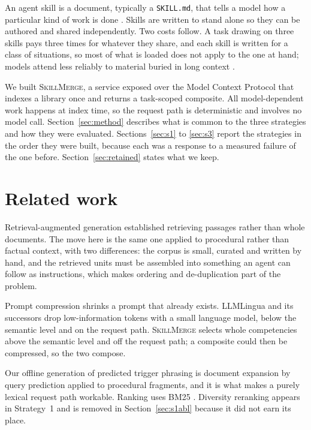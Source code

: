 \documentclass[11pt]{article}
\newcommand{\sm}{\textsc{SkillMerge}}
\begin{document}
An agent skill is a document, typically a \texttt{SKILL.md}, that tells a model how a particular
kind of work is done \citep{anthropic2025skills}. Skills are written to stand alone so they can be
authored and shared independently. Two costs follow. A task drawing on three skills pays three
times for whatever they share, and each skill is written for a class of situations, so most of what
is loaded does not apply to the one at hand; models attend less reliably to material buried in long
context \citep{liu2024lost}.

We built \sm{}, a service exposed over the Model Context Protocol \citep{anthropic2024mcp} that
indexes a library once and returns a task-scoped composite. All model-dependent work happens at
index time, so the request path is deterministic and involves no model call. Section~\ref{sec:method}
describes what is common to the three strategies and how they were evaluated.
Sections~\ref{sec:s1} to \ref{sec:s3} report the strategies in the order they were built, because
each was a response to a measured failure of the one before. Section~\ref{sec:retained} states what
we keep.

\section{Related work}

Retrieval-augmented generation \citep{lewis2020rag} established retrieving passages rather than
whole documents. The move here is the same one applied to procedural rather than factual context,
with two differences: the corpus is small, curated and written by hand, and the retrieved units
must be assembled into something an agent can follow as instructions, which makes ordering and
de-duplication part of the problem.

Prompt compression shrinks a prompt that already exists. LLMLingua \citep{jiang2023llmlingua} and
its successors \citep{pan2024llmlingua2} drop low-information tokens with a small language model,
below the semantic level and on the request path. \sm{} selects whole competencies above the
semantic level and off the request path; a composite could then be compressed, so the two compose.

Our offline generation of predicted trigger phrasing is document expansion by query prediction
\citep{nogueira2019doc2query} applied to procedural fragments, and it is what makes a purely
lexical request path workable. Ranking uses BM25 \citep{robertson2009bm25}. Diversity reranking
\citep{carbonell1998mmr} appears in Strategy~1 and is removed in Section~\ref{sec:s1abl} because it
did not earn its place.
\end{document}
